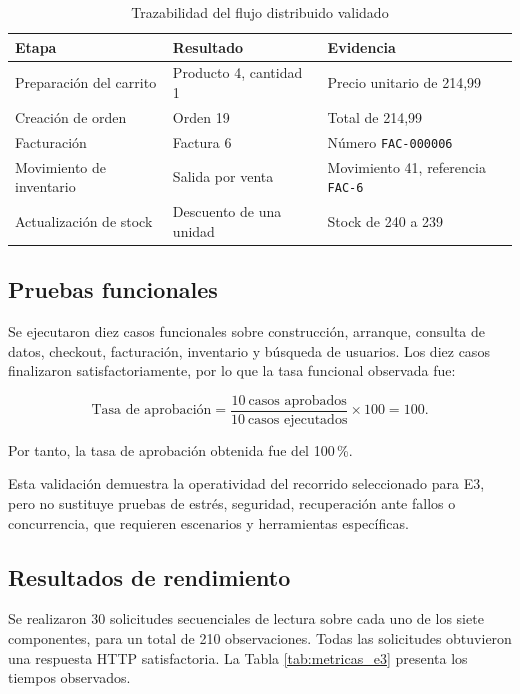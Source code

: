 \documentclass[12pt]{article}
\begin{document}
    \begin{table}[H]
        \centering
        \caption{Trazabilidad del flujo distribuido validado}
        \label{tab:flujo_validado}
        \small
        \begin{tabularx}{\textwidth}{p{3.2cm} X X}
\toprule
\textbf{Etapa} & \textbf{Resultado} & \textbf{Evidencia} \\
\midrule
Preparación del carrito & Producto 4, cantidad 1 & Precio unitario de 214,99 \\
Creación de orden & Orden 19 & Total de 214,99 \\
Facturación & Factura 6 & Número \texttt{FAC-000006} \\
Movimiento de inventario & Salida por venta & Movimiento 41, referencia \texttt{FAC-6} \\
Actualización de stock & Descuento de una unidad & Stock de 240 a 239 \\
\bottomrule
        \end{tabularx}
    \end{table}

    \subsection{Pruebas funcionales}

    Se ejecutaron diez casos funcionales sobre construcción, arranque, consulta de datos, checkout, facturación, inventario y búsqueda de usuarios. Los diez casos finalizaron satisfactoriamente, por lo que la tasa funcional observada fue:

    \[
        \text{Tasa de aprobación} =
        \frac{10\ \text{casos aprobados}}{10\ \text{casos ejecutados}}
        \times 100 = 100.
    \]

    Por tanto, la tasa de aprobación obtenida fue del 100\,\%.

    Esta validación demuestra la operatividad del recorrido seleccionado para E3, pero no sustituye pruebas de estrés, seguridad, recuperación ante fallos o concurrencia, que requieren escenarios y herramientas específicas.

    \subsection{Resultados de rendimiento}

    Se realizaron 30 solicitudes secuenciales de lectura sobre cada uno de los siete componentes, para un total de 210 observaciones. Todas las solicitudes obtuvieron una respuesta HTTP satisfactoria. La Tabla \ref{tab:metricas_e3} presenta los tiempos observados.
\end{document}
